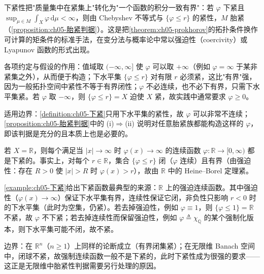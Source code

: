 \documentclass[../../main.tex]{subfiles}%
\begin{document}
\begin{remark}\label{remark:ch05-下紧动机}
下紧性把"质量集中在紧集上"转化为"一个函数的积分一致有界"：若 $\varphi$ 下紧且 $\sup_{\mu\in M}\int_X\varphi\,\mathrm{d}\mu<\infty$，则由 Chebyshev 不等式与 $\{\varphi\leqslant r\}$ 的紧性，$M$ 胎紧（\cref{proposition:ch05-胎紧判据}）。这是把\cref{theorem:ch05-prokhorov}的拓扑条件换作可计算的矩条件的标准手法，在变分法与概率论中常以强迫性（coercivity）或 Lyapunov 函数的形式出现。

各项约定与假设的作用：值域取 $(-\infty,\infty]$ 使 $\varphi$ 可以取 $+\infty$（例如 $\varphi=\infty$ 于某非紧集之外），从而便于构造；下水平集 $\{\varphi\leqslant r\}$ 对有限 $r$ 必须紧，这比"有界"强，因为一般拓扑空间中紧性不等于有界闭性；$\varphi$ 不必连续，也不必下有界，只需下水平集紧。若 $\varphi$ 取 $-\infty$，则 $\{\varphi\leqslant r\}=X$ 迫使 $X$ 紧，故实践中通常要求 $\varphi\geqslant0$。

适用边界：\cref{definition:ch05-下紧}只用下水平集的紧性，故 $\varphi$ 可以非常不连续；\cref{proposition:ch05-胎紧判据}中的 (i)$\Rightarrow$(ii) 说明对任意胎紧族都能构造这样的 $\varphi$，即该判据是充分的且本质上也是必要的。
\end{remark}

\begin{example}\label{example:ch05-下紧}
若 $X=\mathbb{R}$，则每个满足当 $|x|\to\infty$ 时 $\varphi(x)\to\infty$ 的连续函数 $\varphi:\mathbb{R}\to[0,\infty)$ 都是下紧的。事实上，对每个 $r\in\mathbb{R}$，集合 $\{\varphi\leqslant r\}$ 闭（$\varphi$ 连续）且有界（由强迫性：存在 $R>0$ 使 $|x|>R$ 时 $\varphi(x)>r$），故由 $\mathbb{R}$ 中的 Heine–Borel 定理紧。
\end{example}

\begin{remark}\label{remark:ch05-下紧例子}
\cref{example:ch05-下紧}给出下紧函数最典型的来源：$\mathbb{R}$ 上的强迫连续函数。其中强迫性（$\varphi(x)\to\infty$）保证下水平集有界，连续性保证它闭，非负性只影响 $r<0$ 时的下水平集（此时为空集，仍紧）。若去掉强迫性，例如 $\varphi\equiv1$，则 $\{\varphi\leqslant1\}=\mathbb{R}$ 不紧，故 $\varphi$ 不下紧；若去掉连续性而保留强迫性，例如 $\varphi\triangleq\chi_{\mathbb{Q}}$ 的某个强制化版本，则下水平集可能不闭，故不紧。

边界：在 $\mathbb{R}^n$（$n\geqslant1$）上同样的论断成立（有界闭集紧）；在无限维 Banach 空间中，闭球不紧，故强制连续函数一般不是下紧的，此时下紧性成为很强的要求——这正是无限维中胎紧性判据需要另行处理的原因。
\end{remark}
\end{document}
